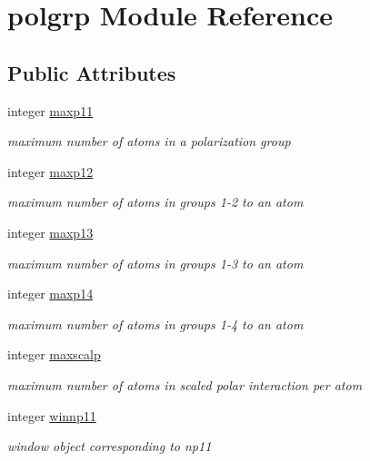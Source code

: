 \hypertarget{classpolgrp}{\section{polgrp Module Reference}
\label{classpolgrp}
}
\subsection*{Public Attributes}
\begin{DoxyCompactItemize}
\item 
integer \hyperlink{classpolgrp_a639d70e86d1cffb5e1f57f85dcb044b1}{maxp11}
\begin{DoxyCompactList}\small\item\em maximum number of atoms in a polarization group \end{DoxyCompactList}\item 
integer \hyperlink{classpolgrp_ada0249a564d7182b65235560758f5737}{maxp12}
\begin{DoxyCompactList}\small\item\em maximum number of atoms in groups 1-\/2 to an atom \end{DoxyCompactList}\item 
integer \hyperlink{classpolgrp_aaaadc556f3d3361854cf9247f07a89db}{maxp13}
\begin{DoxyCompactList}\small\item\em maximum number of atoms in groups 1-\/3 to an atom \end{DoxyCompactList}\item 
integer \hyperlink{classpolgrp_a2febf4fbf3f6284c93120f4af3659844}{maxp14}
\begin{DoxyCompactList}\small\item\em maximum number of atoms in groups 1-\/4 to an atom \end{DoxyCompactList}\item 
integer \hyperlink{classpolgrp_ac72b886208bc9efbeccf87e9b6f99c0f}{maxscalp}
\begin{DoxyCompactList}\small\item\em maximum number of atoms in scaled polar interaction per atom \end{DoxyCompactList}\item 
integer \hyperlink{classpolgrp_ad301759501dd29ae3dd0d1808b9e667e}{winnp11}
\begin{DoxyCompactList}\small\item\em window object corresponding to np11 \end{DoxyCompactList}\item 

\end{DoxyCompactItemize}
